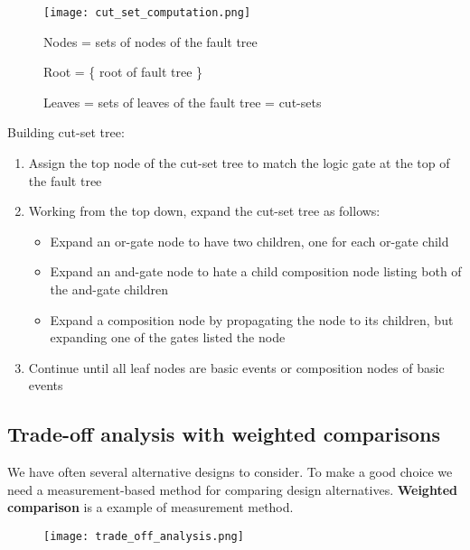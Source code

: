 \begin{figure}[!ht]
    \begin{minipage}{\linewidth}
        \begin{minipage}{0.45\linewidth}
            \centering
            \texttt{[image: cut\_set\_computation.png]}
        \end{minipage}
        \begin{minipage}{0.45\linewidth}
            Nodes = sets of nodes of the fault tree

            Root = \{ root of fault tree \}

            Leaves = sets of leaves of the fault tree
            = cut-sets
        \end{minipage}
    \end{minipage}
\end{figure}

Building cut-set tree:
\begin{enumerate}
    \item Assign the top node of the cut-set tree to match the logic gate at the top of the fault
tree
    \item Working from the top down, expand the cut-set tree as follows:
    \begin{itemize}
        \item Expand an or-gate node to have two children, one for each or-gate child
        \item Expand an and-gate node to hate a child composition node listing both of the and-gate children
        \item Expand a composition node by propagating the node to its children, but expanding one of the gates listed the node
    \end{itemize}
    \item Continue until all leaf nodes are basic events or composition nodes of basic events
\end{enumerate}

\subsection{Trade-off analysis with weighted comparisons}

We have often several alternative designs to consider. To make a good choice we need a
measurement-based method for comparing design alternatives.
\textbf{Weighted comparison} is a example of measurement method.

\begin{figure}[!ht]
    \centering
    \texttt{[image: trade\_off\_analysis.png]}
\end{figure}

